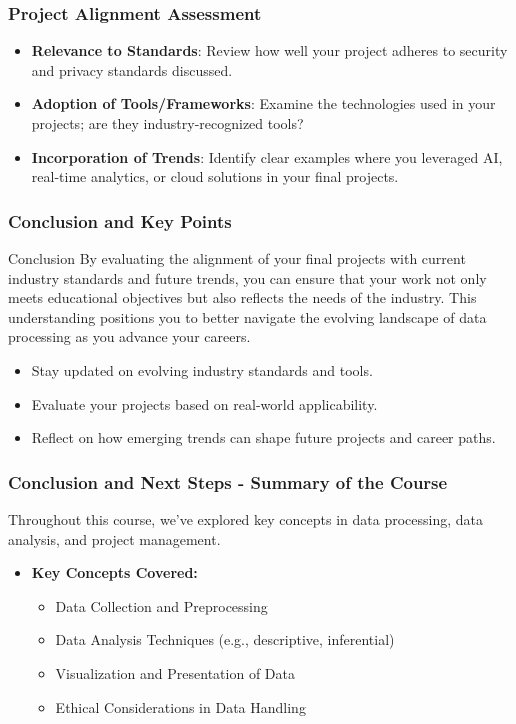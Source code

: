 \documentclass[aspectratio=169]{beamer}
\begin{document}
\begin{frame}[fragile]
    \frametitle{Project Alignment Assessment}
    \begin{itemize}
        \item \textbf{Relevance to Standards}: Review how well your project adheres to security and privacy standards discussed.
        \item \textbf{Adoption of Tools/Frameworks}: Examine the technologies used in your projects; are they industry-recognized tools?
        \item \textbf{Incorporation of Trends}: Identify clear examples where you leveraged AI, real-time analytics, or cloud solutions in your final projects.
    \end{itemize}
\end{frame}

\begin{frame}[fragile]
    \frametitle{Conclusion and Key Points}
    \begin{block}{Conclusion}
        By evaluating the alignment of your final projects with current industry standards and future trends, you can ensure that your work not only meets educational objectives but also reflects the needs of the industry. This understanding positions you to better navigate the evolving landscape of data processing as you advance your careers.
    \end{block}
    
    \begin{itemize}
        \item Stay updated on evolving industry standards and tools.
        \item Evaluate your projects based on real-world applicability.
        \item Reflect on how emerging trends can shape future projects and career paths.
    \end{itemize}
\end{frame}

\begin{frame}[fragile]
    \frametitle{Conclusion and Next Steps - Summary of the Course}
    Throughout this course, we've explored key concepts in data processing, data analysis, and project management. 

    \begin{itemize}
        \item \textbf{Key Concepts Covered:}
        \begin{itemize}
            \item Data Collection and Preprocessing 
            \item Data Analysis Techniques (e.g., descriptive, inferential)
            \item Visualization and Presentation of Data
            \item Ethical Considerations in Data Handling
        \end{itemize}
    \end{itemize}
\end{frame}
\end{document}
